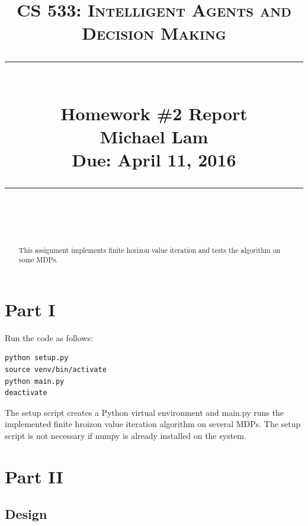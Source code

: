 \documentclass[paper=a4, fontsize=11pt]{scrartcl}
\newcommand{\lecture}{Homework \#2 Report} %
\newcommand{\lecturedate}{Due: April 11, 2016} %
\newcommand{\scribe}{Michael Lam} %
\begin{document}
\newcommand{\horrule}[1]{\rule{\linewidth}{#1}} %

\title{	
\normalfont \normalsize
\vspace{-30pt}
\textsc{CS 533: Intelligent Agents and Decision Making} \\ [10pt]
\horrule{0.5pt} \\[0.4cm] %
\LARGE \lecture\\ %
\vspace{5pt}
\normalsize \scribe\\
\lecturedate\\
\horrule{2pt} \\[0.5cm] %
}


\date{} %

\maketitle
\vspace{-100pt}

\begin{abstract}
This assignment implements finite horizon value iteration and tests the algorithm on some MDPs.
\end{abstract}

\section{Part I}

Run the code as follows:

\begin{verbatim}
python setup.py
source venv/bin/activate
python main.py
deactivate
\end{verbatim}

The setup script creates a Python virtual environment and main.py runs the implemented finite hroizon value iteration algorithm on several MDPs. The setup script is not necessary if numpy is already installed on the system.

\section{Part II}

\subsection{Design}
\end{document}
